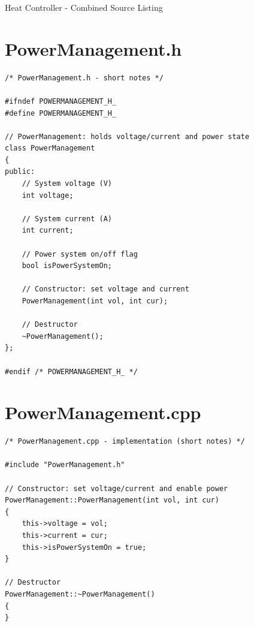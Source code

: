 \documentclass[11pt]{article}
\begin{document}
\begin{center}
  {\LARGE Heat Controller - Combined Source Listing}
\end{center}
\vspace{6pt}
\bigskip

\section*{PowerManagement.h}
\begin{lstlisting}
/* PowerManagement.h - short notes */

#ifndef POWERMANAGEMENT_H_
#define POWERMANAGEMENT_H_

// PowerManagement: holds voltage/current and power state
class PowerManagement
{
public:
    // System voltage (V)
    int voltage;

    // System current (A)
    int current;

    // Power system on/off flag
    bool isPowerSystemOn;

    // Constructor: set voltage and current
    PowerManagement(int vol, int cur);

    // Destructor
    ~PowerManagement();
};

#endif /* POWERMANAGEMENT_H_ */
\end{lstlisting}

\section*{PowerManagement.cpp}
\begin{lstlisting}
/* PowerManagement.cpp - implementation (short notes) */

#include "PowerManagement.h"

// Constructor: set voltage/current and enable power
PowerManagement::PowerManagement(int vol, int cur)
{
    this->voltage = vol;
    this->current = cur;
    this->isPowerSystemOn = true;
}

// Destructor
PowerManagement::~PowerManagement()
{
}
\end{lstlisting}
\end{document}
